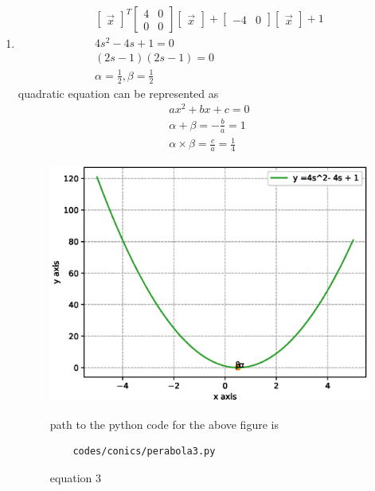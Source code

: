 \begin{enumerate}[label=\arabic*.,ref=\thesubsection.\theenumi]
\item
\begin{align}
\begin{bmatrix}\vec x\end{bmatrix}^T\begin{bmatrix}4 & 0\\0 & 0\end{bmatrix}\begin{bmatrix}\vec x\end{bmatrix} + \begin{bmatrix}-4 & 0\end{bmatrix}\begin{bmatrix}\vec x\end{bmatrix} +1
\\
4s^2-4s+1 = 0
\\
\left(2s-1\right)\left(2s - 1\right) = 0
\\
\alpha = \frac{1}{2} ,\beta =\frac{1}{2} 
\end{align}
quadratic equation can be represented as 
\begin{align}
ax^2+bx +c = 0
\\
\alpha +\beta = -\frac{b}{a} = 1
\\
\alpha \times \beta = \frac{c}{a} = \frac{1}{4}
\end{align}
\begin{figure}[!ht]
	\centering
	\includegraphics[width=\columnwidth]{./figures/conics/perabola3.eps}
	\caption{equation 3 }
	\label{fig:perabola3}
	path to the python code for the above figure is
	\begin{lstlisting}
	codes/conics/perabola3.py
	\end{lstlisting} 
\end{figure}



\end{enumerate}
